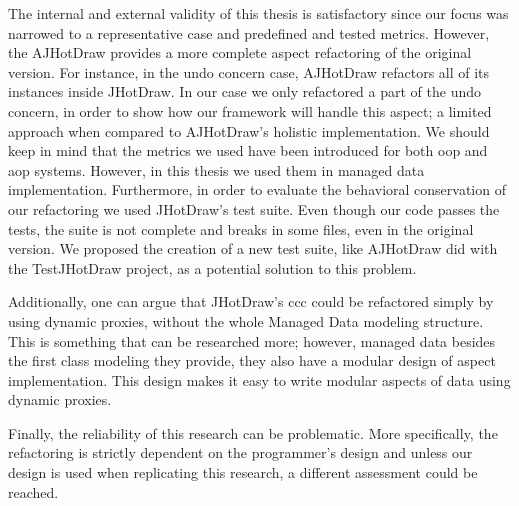 The internal and external validity of this thesis is satisfactory since our focus was narrowed to a representative case and predefined and tested metrics.
However, the AJHotDraw provides a more complete aspect refactoring of the original version.
For instance, in the undo concern case, AJHotDraw refactors all of its instances inside JHotDraw. 
In our case we only refactored a part of the undo concern, in order to show how our framework will handle this aspect; a limited approach when compared to AJHotDraw's holistic implementation.
We should keep in mind that the metrics we used have been introduced for both \ac{oop} and \ac{aop} systems.
However, in this thesis we used them in managed data implementation. 
Furthermore, in order to evaluate the behavioral conservation of our refactoring we used JHotDraw's test suite.
Even though our code passes the tests, the suite is not complete and breaks in some files, even in the original version.
We proposed the creation of a new test suite, like AJHotDraw did with the TestJHotDraw project, as a potential solution to this problem.

Additionally, one can argue that JHotDraw's \ac{ccc} could be refactored simply by using dynamic proxies, without the whole Managed Data modeling structure.
This is something that can be researched more; however, managed data besides the first class modeling they provide, they also have a modular design of aspect implementation.
This design makes it easy to write modular aspects of data using dynamic proxies.

Finally, the reliability of this research can be problematic.
More specifically, the refactoring is strictly dependent on the programmer's design and unless our design is used when replicating this research, a different assessment could be reached.
